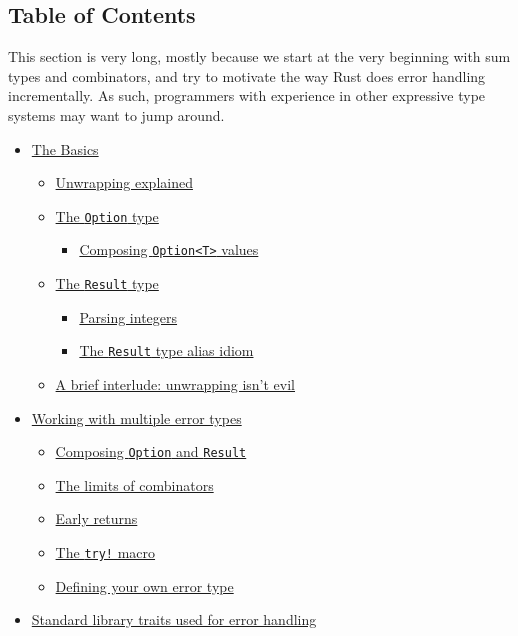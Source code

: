 \documentclass[a4paper,]{book}
\providecommand{\tightlist}{%
  \setlength{\itemsep}{0pt}\setlength{\parskip}{0pt}}
\begin{document}
\subsection{Table of Contents}\label{table-of-contents}

This section is very long, mostly because we start at the very beginning
with sum types and combinators, and try to motivate the way Rust does
error handling incrementally. As such, programmers with experience in
other expressive type systems may want to jump around.

\begin{itemize}
\tightlist
\item
  \protect\hyperlink{the-basics}{The Basics}

  \begin{itemize}
  \tightlist
  \item
    \protect\hyperlink{unwrapping-explained}{Unwrapping explained}
  \item
    \protect\hyperlink{the-option-type}{The \texttt{Option} type}

    \begin{itemize}
    \tightlist
    \item
      \protect\hyperlink{composing-optiont-values}{Composing
      \texttt{Option\textless{}T\textgreater{}} values}
    \end{itemize}
  \item
    \protect\hyperlink{the-result-type}{The \texttt{Result} type}

    \begin{itemize}
    \tightlist
    \item
      \protect\hyperlink{parsing-integers}{Parsing integers}
    \item
      \protect\hyperlink{the-result-type-alias-idiom}{The
      \texttt{Result} type alias idiom}
    \end{itemize}
  \item
    \protect\hyperlink{a-brief-interlude-unwrapping-isnt-evil}{A brief
    interlude: unwrapping isn't evil}
  \end{itemize}
\item
  \protect\hyperlink{working-with-multiple-error-types}{Working with
  multiple error types}

  \begin{itemize}
  \tightlist
  \item
    \protect\hyperlink{composing-option-and-result}{Composing
    \texttt{Option} and \texttt{Result}}
  \item
    \protect\hyperlink{the-limits-of-combinators}{The limits of
    combinators}
  \item
    \protect\hyperlink{early-returns}{Early returns}
  \item
    \protect\hyperlink{the-try-macro}{The \texttt{try!} macro}
  \item
    \protect\hyperlink{defining-your-own-error-type}{Defining your own
    error type}
  \end{itemize}
\item
  \protect\hyperlink{standard-library-traits-used-for-error-handling}{Standard
  library traits used for error handling}


\end{itemize}
\end{document}
